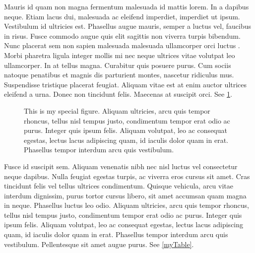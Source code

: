 Mauris id quam non magna fermentum malesuada id mattis lorem. In a dapibus neque. Etiam lacus dui, malesuada ac eleifend imperdiet, imperdiet ut ipsum. Vestibulum id ultricies est. Phasellus augue mauris, semper a luctus vel, faucibus in risus. Fusce commodo augue quis elit sagittis non viverra turpis bibendum. Nunc placerat sem non sapien malesuada malesuada ullamcorper orci luctus \cite{adams1980hitchhiker}. Morbi pharetra ligula integer mollis mi nec neque ultrices vitae volutpat leo ullamcorper. In at tellus magna. Curabitur quis posuere purus. Cum sociis natoque penatibus et magnis dis parturient montes, nascetur ridiculus mus. Suspendisse tristique placerat feugiat. Aliquam vitae est at enim auctor ultrices eleifend a urna. Donec non tincidunt felis. Maecenas at suscipit orci. See \cref{myFigure}.
\begin{figure}
    \centering
    \caption{This is my special figure. Aliquam ultricies, arcu quis tempor rhoncus, tellus nisl tempus justo, condimentum tempor erat odio ac purus. Integer quis ipsum felis. Aliquam volutpat, leo ac consequat egestas, lectus lacus adipiscing quam, id iaculis dolor quam in erat. Phasellus tempor interdum arcu quis vestibulum.}
    \label{myFigure}
\end{figure}

Fusce id suscipit sem. Aliquam venenatis nibh nec nisl luctus vel consectetur neque dapibus. Nulla feugiat egestas turpis, ac viverra eros cursus sit amet. Cras tincidunt felis vel tellus ultrices condimentum. Quisque vehicula, arcu vitae interdum dignissim, purus tortor cursus libero, sit amet accumsan quam magna in neque. Phasellus luctus leo odio. Aliquam ultricies, arcu quis tempor rhoncus, tellus nisl tempus justo, condimentum tempor erat odio ac purus. Integer quis ipsum felis. Aliquam volutpat, leo ac consequat egestas, lectus lacus adipiscing quam, id iaculis dolor quam in erat. Phasellus tempor interdum arcu quis vestibulum. Pellentesque sit amet augue purus. See \cref{myTable}.

